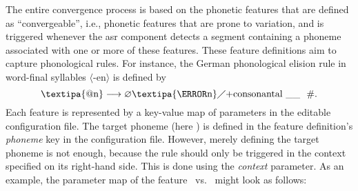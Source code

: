 The entire convergence process is based on the phonetic features that are defined as \enquote{convergeable}, i.e., phonetic features that are prone to variation, and is triggered whenever the \ac{asr} component detects a segment containing a phoneme associated with one or more of these features.
These feature definitions aim to capture phonological rules.
For instance, the German phonological  elision rule in word-final syllables $\langle$-en$\rangle$ is defined by \citep[adapted from][pp.\,142--143]{Benware1986phonetics}
%
\begin{equation}
\text{\textipa{@n}}\longrightarrow \varnothing \text{\textipa{\s{n}}} \diagup
\text{+consonantal} \ \_\_ \ \ \text{\#} .
\label{eq:elision_rule}
\end{equation}
%
Each feature is represented by a key-value map of parameters in the editable configuration file.
The target phoneme (here ) is defined in the feature definition's \emph{phoneme} key in the configuration file.
However, merely defining the target phoneme is not enough, because the rule should only be triggered in the context specified on its right-hand side.
This is done using the \emph{context} parameter.
As an example, the parameter map of the feature \textipa{[E:]}~vs.~\textipa{[e:]} might look as follows:

